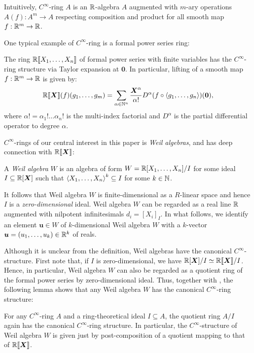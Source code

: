 \documentclass[%
  sigconf,authorversion,screen]{acmart}
\begin{document}
Intuitively, $C^\infty$-ring $A$ is an $\mathbb{R}$-algebra $A$ augmented with $m$-ary operations $A(f): A^m \to A$ respecting composition and product for all smooth map $f: \mathbb{R}^m \to \mathbb{R}$.

One typical example of $C^\infty$-ring is a formal power series ring:

\begin{theorem}[Lawvere]\label{thm:series-is-smooth}
  The ring $\mathbb{R}\llbracket X_1, \dots, X_n\rrbracket$ of formal power series with finite variables has the $C^\infty$-ring structure via Taylor expansion at $\boldsymbol{0}$.
  In particular, lifting of a smooth map $f: \mathbb{R}^m \to \mathbb{R}$ is given by:
  \[
    \mathord{\mathbb{R}\llbracket\boldsymbol{X}\rrbracket}(f)(g_1, \dots, g_m) = \sum_{\alpha \in \mathbb{N}^n} \frac{\boldsymbol{X}^\alpha}{\alpha!} D^\alpha(f \circ \braket{g_1, \dots, g_n})(\boldsymbol{0}),
  \]
  where $\alpha! = \alpha_1 ! \dots \alpha_n !$ is the multi-index factorial and $D^\alpha$ is the partial differential operator to degree $\alpha$.
\end{theorem}

$C^\infty$-rings of our central interest in this paper is \emph{Weil algebras}, and has deep connection with $\mathord{\mathbb{R}\llbracket\boldsymbol{X}\rrbracket}$:

\begin{definition}
  A \emph{Weil algebra} $W$ is an algebra of form $W = \mathbb{R}[X_1, \dots, X_n]/I$ for some ideal $I \subseteq \mathbb{R}[\boldsymbol{X}]$ such that $\braket{X_1, \dots, X_n}^k \subseteq I$ for some $k \in \mathbb{N}$.
\end{definition}
It follows that Weil algebra $W$ is finite-dimensional as a $R$-linear space and hence $I$ is a \emph{zero-dimensional} ideal.
Weil algebra $W$ can be regarded as a real line $\mathbb{R}$ augmented with nilpotent infinitesimals $d_i = {[X_i]}_I$.
In what follows, we identify an element $\boldsymbol{u} \in W$ of $k$-dimensional Weil algebra $W$ with a $k$-vector $\boldsymbol{u} = (u_1, \dots, u_k) \in \mathbb{R}^k$ of reals.

Although it is unclear from the definition, Weil algebras have the canonical $C^\infty$-structure.
First note that, if $I$ is zero-dimensional, we have $\mathbb{R}[\boldsymbol{X}]/I \simeq \mathbb{R}\llbracket \boldsymbol{X} \rrbracket /I$.
Hence, in particular, Weil algebra $W$ can also be regarded as a quotient ring of the formal power series by zero-dimensional ideal.
Thus, together with , the following lemma shows that any Weil algebra $W$ has the canonical $C^\infty$-ring structure:

\begin{lemma}\label{lem:quot-ring-ideal}
  For any $C^\infty$-ring $A$ and a ring-theoretical ideal $I \subseteq A$, the quotient ring $A/I$ again has the canonical $C^\infty$-ring structure.
  In particular, the $C^\infty$-structure of Weil algebra $W$ is given just by post-composition of a quotient mapping to that of $\mathord{\mathbb{R}\llbracket\boldsymbol{X}\rrbracket}$.
\end{lemma}
\end{document}
